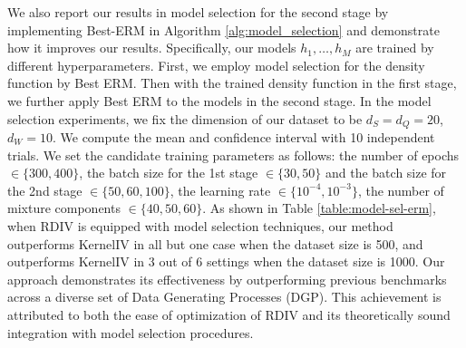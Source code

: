 We also report our results in model selection for the second stage by implementing Best-ERM in Algorithm \ref{alg:model_selection} and demonstrate how it improves our results. 
Specifically, our models $h_1, \dots, h_M$ are trained by different hyperparameters. First, we employ model selection for the density function by Best ERM. Then with the trained density function in the first stage, we further apply Best ERM to the models in the second stage.  In the model selection experiments, we fix the dimension of our dataset to be $d_S = d_Q = 20$, $d_W = 10$. We compute the mean and confidence interval with 10 independent trials. We set the candidate training parameters as follows: the number of epochs $\in\{300,400\}$, the batch size for the 1st stage $\in\{30,50\}$ and the batch size for the 2nd stage $\in\{50,60,100\}$, the learning rate $\in\{10^{-4},10^{-3}\}$, the number of mixture components $\in\{40,50,60\}$. As shown in Table \ref{table:model-sel-erm}, when RDIV is equipped with model selection techniques, our method outperforms KernelIV in all but one case when the dataset size is 500, and outperforms KernelIV in 3 out of 6 settings when the dataset size is 1000. Our approach demonstrates its effectiveness by outperforming previous benchmarks across a diverse set of Data Generating Processes (DGP). This achievement is attributed to both the ease of optimization of RDIV and its theoretically sound integration with model selection procedures.

